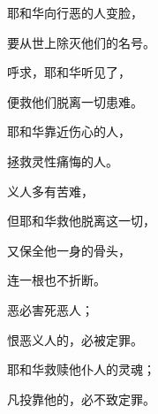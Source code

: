 {\par }{\Q {}耶和华向行恶的人变脸，
\par }{\Q 要从世上除灭他们的名号。
\par }{\Q {}呼求，耶和华听见了，
\par }{\Q 便救他们脱离一切患难。
\par }{\Q {}耶和华靠近伤心的人，
\par }{\Q 拯救灵性痛悔的人。
\par }{\BB \par }{\Q {}义人多有苦难，
\par }{\Q 但耶和华救他脱离这一切，
\par }{\Q {}又保全他一身的骨头，
\par }{\Q 连一根也不折断。
\par }{\Q {}恶必害死恶人；
\par }{\Q 恨恶义人的，必被定罪。
\par }{\Q {}耶和华救赎他仆人的灵魂；
\par }{\Q 凡投靠他的，必不致定罪。

}

